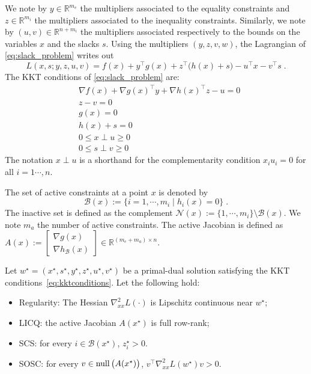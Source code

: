 We note by $y \in \mathbb{R}^{m_e}$ the multipliers associated
to the equality constraints and $z \in \mathbb{R}^{m_i}$ the multipliers
associated to the inequality constraints. Similarly, we note
by $(u, v) \in \mathbb{R}^{n + m_i}$ the multipliers associated
respectively to the bounds on the variables $x$ and the slacks $s$.
Using the multipliers $(y, z, v, w)$, the Lagrangian of \eqref{eq:slack_problem} writes out
\begin{equation}
  \label{eq:lagrangian}
  L(x, s; y, z, u, v) = f(x) + y^\top g(x) + z^\top \big(h(x) +s\big)
  - u^\top x - v^\top s \; .
\end{equation}
The KKT conditions of \eqref{eq:slack_problem} are:
\begin{subequations}
  \label{eq:kktconditions}
    \begin{align}
      & \nabla f(x) + \nabla g(x)^\top y + \nabla h(x)^\top z - u = 0 \\
      & z - v = 0 \\
      & g(x) = 0 \\
      & h(x) + s = 0 \\
      \label{eq:kktconditions:compx}
      & 0 \leq x \perp u \geq 0 \\
      \label{eq:kktconditions:comps}
      & 0 \leq s \perp v \geq 0
    \end{align}
\end{subequations}
The notation $x \perp u$ is a shorthand for the complementarity
condition $x_i u_i = 0$ for all $i=1\cdots, n$.

The set of active constraints at a point $x$ is denoted by
\begin{equation}
  \mathcal{B}(x) := \{ i = 1, \cdots, m_i \; | \; h_i(x) = 0 \} \; .
\end{equation}
The inactive set is defined as the complement $\mathcal{N}(x) := \{1, \cdots, m_i \} \setminus \mathcal{B}(x)$.
We note $m_a$ the number of active constraints.
The active Jacobian is defined as $A(x) := \begin{bmatrix} \nabla g(x) \\ \nabla h_{\mathcal{B}}(x) \end{bmatrix} \in \mathbb{R}^{(m_e + m_a) \times n}$.

\begin{assumption}
  \label{hyp:ipm}
  Let $w^\star = (x^\star, s^\star, y^\star, z^\star, u^\star, v^\star)$ be a primal-dual solution
  satisfying the KKT conditions~\eqref{eq:kktconditions}. Let the following hold:
  \begin{itemize}
    \item Regularity: The Hessian $\nabla^2_{x x} L(\cdot)$ is Lipschitz continuous
      near $w^\star$;
    \item LICQ: the active Jacobian $A(x^\star)$ is full row-rank;
    \item SCS: for every $i \in \mathcal{B}(x^\star)$, $z_i^\star > 0$.
    \item SOSC: for every $v \in \operatorname{null}\big(A(x^\star)\big)$,
      $v^\top \nabla_{x x}^2 L(w^\star) v > 0$.
  \end{itemize}
\end{assumption}


